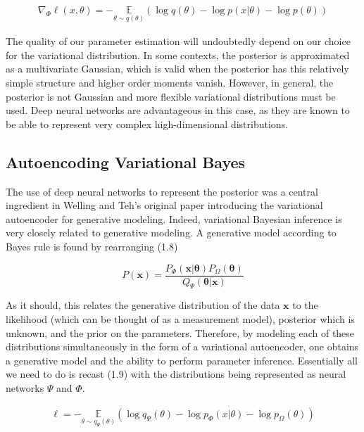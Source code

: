 \documentclass{ucetd}
\begin{document}
\begin{align*}
\nabla_{\Phi}\ell(x,\theta) = - \underset{{\theta \sim q(\theta)}}{\mathbb{E}}\left(\log q(\theta) - \log p(x|\theta) - \log p(\theta) \right)
\end{align*}

The quality of our parameter estimation will undoubtedly depend on our choice for the variational distribution. In some contexts, the posterior is approximated as a multivariate Gaussian, which is valid when the posterior has this relatively simple structure and higher order moments vanish. However, in general, the posterior is not Gaussian and more flexible variational distributions must be used. Deep neural networks are advantageous in this case, as they are known to be able to represent very complex high-dimensional distributions. 

\subsection{Autoencoding Variational Bayes}

The use of deep neural networks to represent the posterior was a central ingredient in Welling and Teh's original paper introducing the variational autoencoder for generative modeling. Indeed, variational Bayesian inference is very closely related to generative modeling. A generative model according to Bayes rule is found by rearranging (1.8)

\begin{equation*}
P(\mathbf{x}) = \frac{P_{\Phi}(\mathbf{x|\theta})P_{\Omega}(\mathbf{\theta})}{Q_{\Psi}(\mathbf{\theta|x})}
\end{equation*}

As it should, this relates the generative distribution of the data $\bm{x}$ to the likelihood (which can be thought of as a measurement model), posterior which is unknown, and the prior on the parameters. Therefore, by modeling each of these distributions simultaneously in the form of a variational autoencoder, one obtains a generative model and the ability to perform parameter inference. Essentially all we need to do is recast (1.9) with the distributions being represented as neural networks $\Psi$ and $\Phi$.

\begin{align}
\ell = - \underset{{\theta \sim q_{\Psi}(\theta)}}{\mathbb{E}}\left(\log q_{\Psi}(\theta) - \log p_{\Phi}(x|\theta) - \log p_{\Omega}(\theta) \right)
\end{align}
\end{document}
